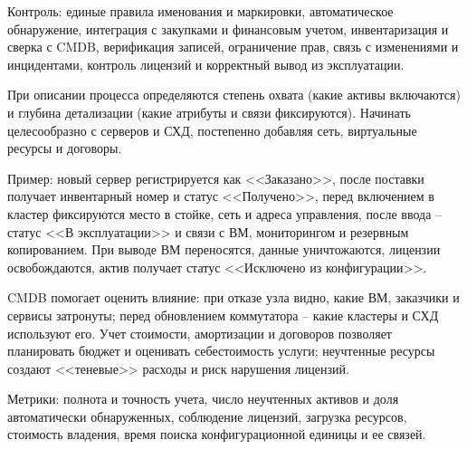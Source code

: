 \documentclass[14pt,a4paper]{extarticle}
\begin{document}
Контроль: единые правила именования и маркировки, автоматическое обнаружение,
интеграция с закупками и финансовым учетом, инвентаризация и сверка с CMDB,
верификация записей, ограничение прав, связь с изменениями и инцидентами,
контроль лицензий и корректный вывод из эксплуатации.

При описании процесса определяются степень охвата (какие активы включаются) и
глубина детализации (какие атрибуты и связи фиксируются). Начинать целесообразно
с серверов и СХД, постепенно добавляя сеть, виртуальные ресурсы и договоры.

Пример: новый сервер регистрируется как <<Заказано>>, после поставки получает
инвентарный номер и статус <<Получено>>, перед включением в кластер фиксируются
место в стойке, сеть и адреса управления, после ввода -- статус <<В эксплуатации>>
и связи с ВМ, мониторингом и резервным копированием. При выводе ВМ переносятся,
данные уничтожаются, лицензии освобождаются, актив получает статус <<Исключено из
конфигурации>>.

CMDB помогает оценить влияние: при отказе узла видно, какие ВМ, заказчики и
сервисы затронуты; перед обновлением коммутатора -- какие кластеры и СХД
используют его. Учет стоимости, амортизации и договоров позволяет планировать
бюджет и оценивать себестоимость услуги; неучтенные ресурсы создают <<теневые>>
расходы и риск нарушения лицензий.

Метрики: полнота и точность учета, число неучтенных активов и доля автоматически
обнаруженных, соблюдение лицензий, загрузка ресурсов, стоимость владения, время
поиска конфигурационной единицы и ее связей.
\end{document}
